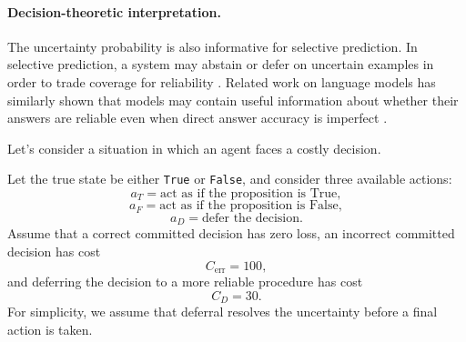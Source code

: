 \documentclass[twoside]{article}
\begin{document}
\paragraph{Decision-theoretic interpretation.}

The uncertainty probability is also informative for selective
prediction. In selective prediction, a system may abstain or defer on
uncertain examples in order to trade coverage for reliability
\cite{xin2021art}. Related work on language models has similarly shown
that models may contain useful information about whether their answers
are reliable even when direct answer accuracy is imperfect
\cite{kadavath2022language}.






Let's consider a situation in which an agent faces a costly decision.

Let the true state be either \texttt{True} or \texttt{False}, and
consider three available actions:
\[
a_T=\text{act as if the proposition is True},
\]
\[
a_F=\text{act as if the proposition is False},
\]
\[
a_D=\text{defer the decision}.
\]
Assume that a correct committed decision has zero loss, an incorrect
committed decision has cost
\[
C_{\mathrm{err}}=100,
\]
and deferring the decision to a more reliable procedure has cost
\[
C_D=30.
\]
For simplicity, we assume that deferral resolves the uncertainty before
a final action is taken.
\end{document}
